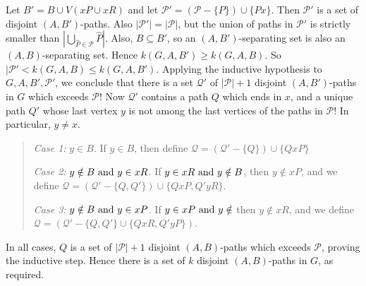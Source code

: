 \begin{theorem}
{    Let \(B' = B \cup V(xP \cup xR)\) and let \(\mathcal{P}' = (\mathcal{P} - \{P\}) \cup \{Px\}\). Then \(\mathcal{P}'\) is a set of disjoint \((A, B')\)-paths. Also \(|\mathcal{P}'| = |\mathcal{P}|\), but the union of paths in \(\mathcal{P'}\) is strictly smaller than \(|\bigcup_{\hat{P} \in \mathcal{P}} \hat{P}|\). Also, \(B \subseteq B'\), so an \((A, B')\)-separating set is also an \((A, B)\)-separating set. Hence \(k(G, A, B') \geq k(G, A, B)\). So \(|\mathcal{P'} < k(G, A, B) \leq k(G, A, B')\). Applying the inductive hypothesis to \(G, A, B', \mathcal{P'}\), we conclude that there is a set \(\mathcal{Q'}\) of \(|\mathcal{P}| + 1\) disjoint \((A, B')\)-paths in \(G\) which exceeds \(\mathcal{P}\)! Now \(\mathcal{Q'}\) contains a path \(Q\) which ends in \(x\), and a unique path \(Q'\) whose last vertex \(y\) is not among the last vertices of the paths in \(\mathcal{P}\)! In particular, \(y \neq x\).
    \begin{quote}
        {\it Case 1:} \(y \in B\).  If \(y \in B\), then define \(\mathcal{Q} = (\mathcal{Q'} - \{Q\}) \cup \{QxP\}\)

        {\it Case 2:} \(y \notin B \text{ and } y \in xR\). If \(y \in xR \text{ and } y \notin B\), then \(y \notin xP\), and we define \(\mathcal{Q} = (\mathcal{Q'} - \{Q, Q'\}) \cup \{QxP, Q'yR\}\).

            {\it Case 3:} \(y \notin B \text{ and } y \in xP\). If \(y \in xP \text{ and } y \notin\) then \(y \notin xR\), and we define \(\mathcal{Q} = (\mathcal{Q'} - \{Q, Q'\} \cup \{QxR, Q'yP\})\).
    \end{quote}
    In all cases, \(Q\) is a set of \(|\mathcal{P}| + 1\) disjoint \((A, B)\)-paths which exceeds \(\mathcal{P}\), proving the inductive step. Hence there is a set of \(k\) disjoint \((A, B)\)-paths in \(G\), as required.
    }
\end{theorem}

